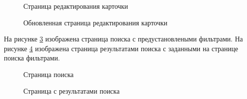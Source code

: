 \newpage %
\begin{figure}[H] %
\caption{Страница редактирования карточки}
\label{test-front5:image}
\end{figure}

\newpage %
\begin{figure}[H] %
\caption{Обновленная страница редактирования карточки}
\label{test-front6:image}
\end{figure}

На рисунке \ref{test-front7:image} изображена страница поиска с предустановлеными фильтрами. На рисунке \ref{test-front8:image} изображена страница результатами поиска с заданными на странице поиска фильтрами.

\newpage %
\begin{figure}[H] %
\caption{Страница поиска}
\label{test-front7:image}
\end{figure}

\newpage %
\begin{figure}[H] %
\caption{Страница с результатами поиска}
\label{test-front8:image}
\end{figure}
